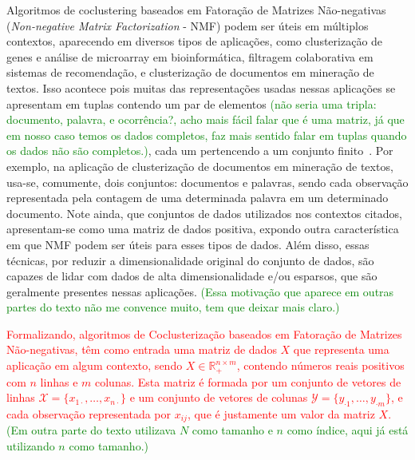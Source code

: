 \documentclass[
    12pt,                %
    oneside,            %
    a4paper,            %
    english,            %
    brazil                %
    ]{abntex2ppgsi}
\begin{document}
Algoritmos de coclustering baseados em Fatoração de Matrizes Não-negativas (\textit{Non-negative Matrix Factorization} - NMF) podem ser úteis em múltiplos contextos, aparecendo em diversos tipos de aplicações, como clusterização de genes e análise de microarray em bioinformática, filtragem colaborativa em sistemas de recomendação, e clusterização de documentos em mineração de textos. %
Isso acontece pois muitas das representações usadas nessas aplicações se apresentam em tuplas contendo um par de elementos \textcolor{green}{(não seria uma tripla: documento, palavra, e ocorrência?, acho mais fácil falar que é uma matriz, já que em nosso caso temos os dados completos, faz mais sentido falar em tuplas quando os dados não são completos.)}, cada um pertencendo a um conjunto finito~\cite{Long2005}.
Por exemplo, na aplicação de clusterização de documentos em mineração de textos, usa-se, comumente, dois conjuntos: documentos e palavras, sendo cada observação representada pela contagem de uma determinada palavra em um determinado documento.
Note ainda, que conjuntos de dados utilizados nos contextos citados, apresentam-se como uma matriz de dados positiva, expondo outra característica em que NMF podem ser úteis para esses tipos de dados.
Além disso, essas técnicas, por reduzir a dimensionalidade original do conjunto de dados, são capazes de lidar com dados de alta dimensionalidade e/ou esparsos, que são geralmente presentes nessas aplicações. \textcolor{green}{(Essa motivação que aparece em outras partes do texto não me convence muito, tem que deixar mais claro.)}

\textcolor{red}{Formalizando, algoritmos de Coclusterização baseados em Fatoração de Matrizes Não-negativas, têm como entrada uma matriz de dados $X$ que representa uma aplicação em algum contexto, sendo $X \in \mathbb{R}^{n \times m}_{+}$, contendo números reais positivos com $n$ linhas e $m$ colunas.
Esta matriz é formada por um conjunto de vetores de linhas $\mathcal{X} = \{ x_{1 \cdot}, \dots, x_{n \cdot} \}$ e um conjunto de vetores de colunas ${\mathcal{Y}} = \{ y_{\cdot 1}, \dots, y_{\cdot m} \}$, e cada observação representada por $x_{ij}$, que é justamente um valor da matriz $X$.}
\textcolor{green}{(Em outra parte do texto utilizava $N$ como tamanho e $n$ como índice, aqui já está utilizando $n$ como tamanho.)}
\end{document}
